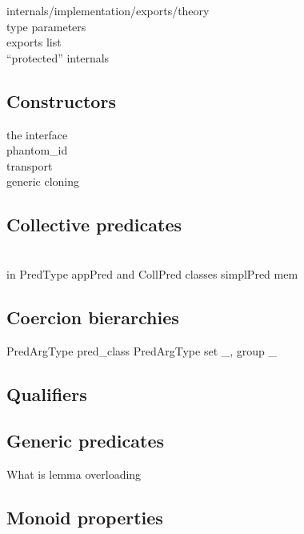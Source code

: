 internals/implementation/exports/theory\\
type parameters\\
exports list\\
``protected'' internals

\subsection{Constructors}

the interface\\
phantom\_id\\
transport\\
generic cloning

\mcbPROVIDE{\\in}

\subsection{Collective predicates}
\\in
PredType
appPred and CollPred classes
simplPred
mem

\subsection{Coercion bierarchies}

PredArgType
pred\_class
PredArgType
{set _}, {group _}

\subsection{Qualifiers}
\subsection{Generic predicates}


What is lemma overloading

\subsection{Monoid properties}

